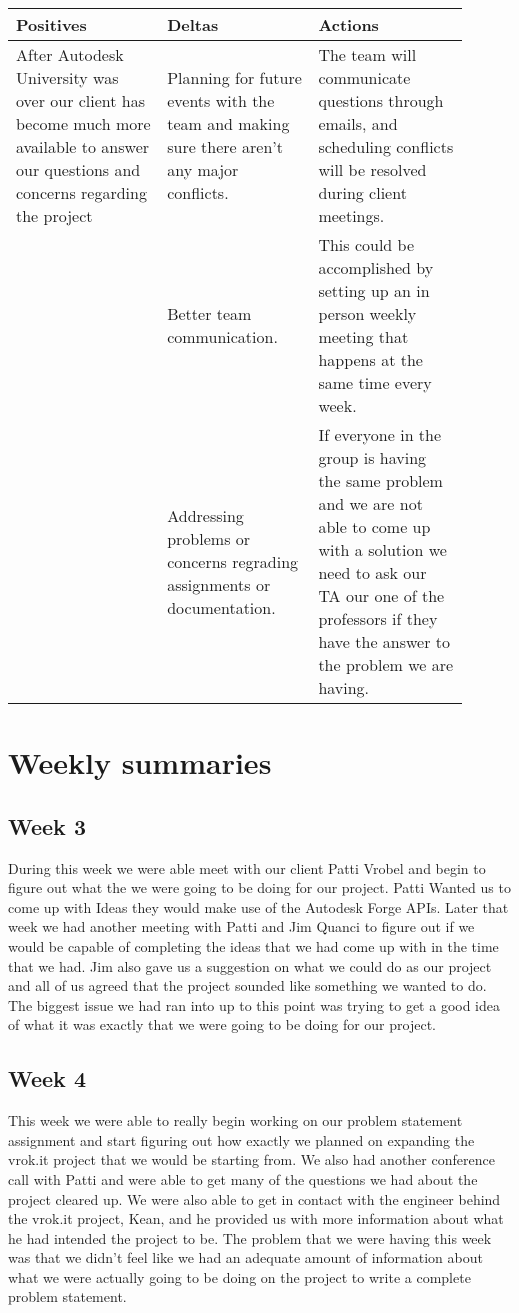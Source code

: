 \documentclass[10pt,draftclsnofoot,onecolumn]{IEEEtran}
\begin{document}
\begin{center}
\begin{tabular}{ |p{0.3\linewidth}|p{0.3\linewidth}|p{0.3\linewidth}| } 
 \hline
 \textbf{Positives} & Deltas & Actions \\ 
\hline
After Autodesk University was over our client has become much more available to answer our questions and concerns regarding the project & Planning for future events with the team and making sure there aren't any major conflicts. & The team will communicate questions through emails, and scheduling conflicts will be resolved during client meetings. \\
\hline
  & Better team communication. & This could be accomplished by setting up an in person weekly meeting that happens at the same time every week. \\
\hline 
  & Addressing problems or concerns regrading assignments or documentation. & If everyone in the group is having the same problem and we are not able to come up with a solution we need to ask our TA our one of the professors if they have the answer to the problem we are having. \\ 
 \hline
\end{tabular}
\end{center}


\section{Weekly summaries}
\subsection{Week 3}
During this week we were able meet with our client Patti Vrobel and begin to figure out what the we were going to be doing for our project. Patti Wanted us to come up with Ideas they would make use of the Autodesk Forge APIs. Later that week we had another meeting with Patti and Jim Quanci to figure out if we would be capable of completing the ideas that we had come up with in the time that we had. Jim also gave us a suggestion on what we could do as our project and all of us agreed that the project sounded like something we wanted to do. The biggest issue we had ran into up to this point was trying to get a good idea of what it was exactly that we were going to be doing for our project.   

\subsection{Week 4}
This week we were able to really begin working on our problem statement assignment and start figuring out how exactly we planned on expanding the vrok.it project that we would be starting from. We also had another conference call with Patti and were able to get many of the questions we had about the project cleared up. We were also able to get in contact with the engineer behind the vrok.it project, Kean, and he provided us with more information about what he had intended the project to be. The problem that we were having this week was that we didn't feel like we had an adequate amount of information about what we were actually going to be doing on the project to write a complete problem statement. 
\end{document}
